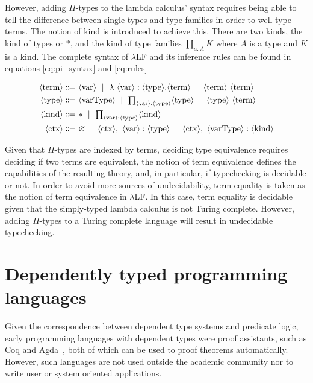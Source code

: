 However, adding $\Pi$-types to the lambda calculus' syntax requires being able
to tell the difference between single types and type families in order to
well-type terms. The notion of kind is introduced to achieve this. There are two
kinds, the kind of types or $*$, and the kind of type families $\prod_{a:A}K$
where $A$ is a type and $K$ is a kind. The complete syntax of $\lambda$LF and its
inference rules can be found in equations \eqref{eq:pi_syntax} and
\eqref{eq:rules} 

\begin{equation}
    \label{eq:pi_syntax}
    \begin{align*}
        \langle \text{term} \rangle \Coloneqq&
        \ \langle \text{var} \rangle 
        \ \mid\ \lambda\ \langle \text{var} \rangle : \langle \text{type} \rangle . \langle \text{term} \rangle
        \ \mid\ \langle \text{term} \rangle\ \langle \text{term} \rangle \\
        \langle \text{type} \rangle \Coloneqq&
        \ \langle \text{varType} \rangle
        \ \mid\ \textstyle \prod_{\langle \text{var} \rangle : \langle \text{type} \rangle} \langle \text{type} \rangle 
        \ \mid\ \langle \text{type} \rangle\ \langle \text{term} \rangle \\
        \langle \text{kind} \rangle \Coloneqq&
        \ *
        \ \mid\ \textstyle \prod_{\langle \text{var} \rangle : \langle \text{type} \rangle} \langle \text{kind} \rangle \\
        \langle \text{ctx} \rangle \Coloneqq&
        \ \varnothing
        \ \mid\ \langle \text{ctx} \rangle,\ \langle \text{var} \rangle : \langle \text{type} \rangle
        \ \mid\ \langle \text{ctx} \rangle,\ \langle \text{varType} \rangle : \langle \text{kind} \rangle
    \end{align*}
\end{equation}

Given that $\Pi$-types are indexed by terms, deciding type equivalence requires
deciding if two terms are equivalent, the notion of term equivalence defines the
capabilities of the resulting theory, and, in particular, if typechecking is
decidable or not. In order to avoid more sources of undecidability, term
equality is taken as the notion of term equivalence in $\lambda$LF. In this
case, term equality is decidable given that the simply-typed lambda calculus is
not Turing complete. However, adding $\Pi$-types to a Turing complete language
will result in undecidable typechecking.

\section{Dependently typed programming languages}

Given the correspondence between dependent type systems and predicate logic,
early programming languages with dependent types were proof assistants, such as
Coq and Agda~\cite{agda}, both of which can be used to proof theorems
automatically.  However, such languages are not used outside the academic
community nor to write user or system oriented applications.

